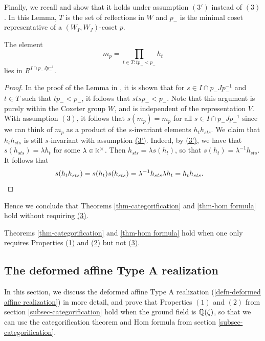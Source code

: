 Finally, we recall \cite[Lemma 7.3.4]{WillSingular} and show that it holds under assumption $\hyperref[assumption 3']{(3')}$ instead of $\hyperref[assumption 3]{(3)}$.
In this Lemma, $T$ is the set of reflections in $W$ and $p_-$ is the minimal coset representative of a $(W_I,W_J)$-coset $p$.
\begin{lemma*}\cite[Lemma 7.3.4]{WillSingular}
    The element 
    $$m_p=\prod_{t\in T: tp_-<p_-}h_t$$
    lies in $R^{I\cap p_-Jp_-^{-1}}$.
\end{lemma*}
\begin{proof}
    In the proof of the Lemma in \cite{WillSingular}, it is shown that for $s \in I \cap p_-Jp_-^{-1}$ and $t \in T$ such that $tp_-<p_-$, it follows that $stsp_-<p_-$. Note that this argument is purely within the Coxeter group $W$, and is independent of the representation $V$. With assumption $\hyperref[assumption 3]{(3)}$, it follows that $s(m_p)=m_p$ for all $s\in I\cap p_-Jp_-^{-1}$ since we can think of $m_p$ as a product of the $s$-invariant elements $h_th_{sts}$. We claim that $h_th_{sts}$ is still $s$-invariant with assumption \hyperref[assumption 3']{(3')}. Indeed, by \hyperref[assumption 3']{(3')}, we have that $s(h_{sts})=\lambda h_{t}$ for some $\lambda \in \Bbbk^\times$. Then $h_{sts}=\lambda s(h_t)$, so that $s(h_t)=\lambda^{-1}h_{sts}.$ 
    It follows that 
    \begin{align*}s(h_th_{sts})=s(h_t)s(h_{sts})=\lambda^{-1}h_{sts}\lambda h_{t}=h_th_{sts}. &\qedhere 
    \end{align*}
\end{proof}

Hence we conclude that Theorems \ref{thm-categorification} and \ref{thm-hom formula} hold without requiring \hyperref[assumption 3]{(3)}.

\begin{theorem} Theorems \ref{thm-categorification} and \ref{thm-hom formula} hold when one only requires Properties \hyperref[assumption 1]{(1)} and \hyperref[assumption 2]{(2)} but not \hyperref[assumption 3]{(3)}. \end{theorem}



% 


\subsection{The deformed affine Type A realization}
\label{subsec-deformed realization}
In this section, we discuss the deformed affine Type A realization (\cref{defn-deformed affine realization}) in more detail, and prove that Properties $\hyperref[assumption 1]{(1)}$ and $\hyperref[assumption 2]{(2)}$ from section \ref{subsec-categorification} hold when the ground field is $\mathbb{Q}(\zeta)$, so that we can use the categorification theorem and Hom formula from section \ref{subsec-categorification}.

